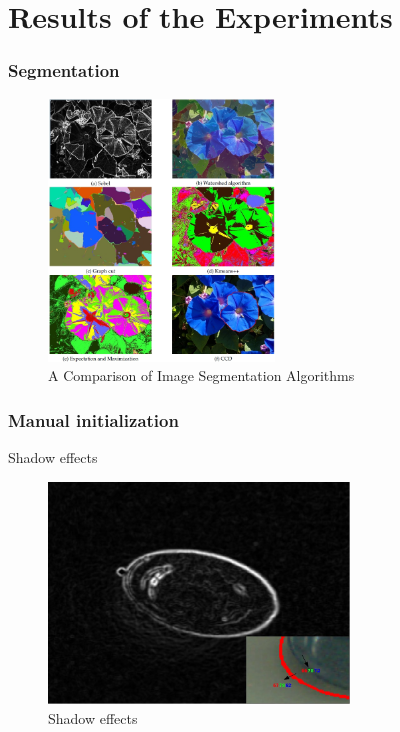 \documentclass[english,10pt,presentation]{beamer}
\begin{document}
\section{Results of the Experiments}
\label{sec-6}
\begin{frame}
\frametitle{Segmentation}
\label{sec-6_1}

   \begin{figure}[htb]
   \centering
   \includegraphics[width=6cm,angle=0]{./segmentation.jpg}
   \caption{\label{fig:seg}A Comparison of Image Segmentation Algorithms}
   \end{figure}
\end{frame}
\begin{frame}
\frametitle{Manual initialization}
\label{sec-6_2}
\begin{alertblock}{Shadow effects}
\label{sec-6_2_1}

    \begin{figure}[htb]
    \centering
    \includegraphics[width=8cm,angle=0]{./edge.jpg}
    \caption{\label{fig:shadow}Shadow effects}
    \end{figure}
\end{alertblock}
\end{frame}
\end{document}
